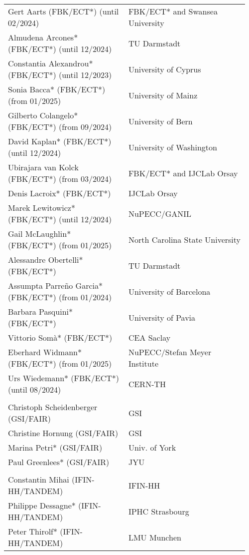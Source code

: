 \begin{longtable}{|L{0.48\linewidth}|C{0.48\linewidth}|}
      \\ \hline
   
Gert Aarts (FBK/ECT*)  (until 02/2024)  & FBK/ECT* and Swansea University \\ \hline
Almudena Arcones* (FBK/ECT*)  (until 12/2024) &  TU Darmstadt \\ \hline
Constantia Alexandrou* (FBK/ECT*)  (until 12/2023) & University of Cyprus \\ \hline
Sonia Bacca* (FBK/ECT*)  (from 01/2025) &  University of Mainz \\ \hline
Gilberto Colangelo* (FBK/ECT*) (from 09/2024) & University of Bern\\ \hline
David Kaplan* (FBK/ECT*)  (until 12/2024) & University of Washington \\ \hline
Ubirajara van Kolck (FBK/ECT*)  (from 03/2024)  & FBK/ECT* and IJCLab Orsay \\ \hline   
Denis Lacroix* (FBK/ECT*)  & IJCLab Orsay \\ \hline
Marek Lewitowicz* (FBK/ECT*)  (until 12/2024)  & NuPECC/GANIL \\ \hline
Gail McLaughlin* (FBK/ECT*)  (from 01/2025) & North Carolina State University \\ \hline
Alessandre Obertelli* (FBK/ECT*)    & TU Darmstadt \\ \hline
Assumpta Parre\~no Garcia* (FBK/ECT*) (from 01/2024) & University of Barcelona \\ \hline
Barbara Pasquini* (FBK/ECT*)    & University of Pavia \\ \hline
Vittorio Somà* (FBK/ECT*)    & CEA Saclay \\ \hline
Eberhard Widmann* (FBK/ECT*) (from 01/2025) & NuPECC/Stefan Meyer Institute\\ \hline
Urs Wiedemann* (FBK/ECT*)  (until 08/2024) & CERN-TH \\ \hline

      \\ \hline
    Christoph Scheidenberger (GSI/FAIR)	& GSI \\ \hline
    Christine Hornung (GSI/FAIR)	& GSI \\ \hline
    Marina Petri* (GSI/FAIR)	& Univ. of York \\ \hline
    Paul Greenlees* (GSI/FAIR)	& JYU \\ \hline

      \\ \hline
    Constantin Mihai (IFIN-HH/TANDEM)	& IFIN-HH \\ \hline
    Philippe Dessagne*  (IFIN-HH/TANDEM)	& IPHC Strasbourg \\ \hline
    Peter Thirolf*  (IFIN-HH/TANDEM)	& LMU Munchen \\ \hline


\end{longtable}
